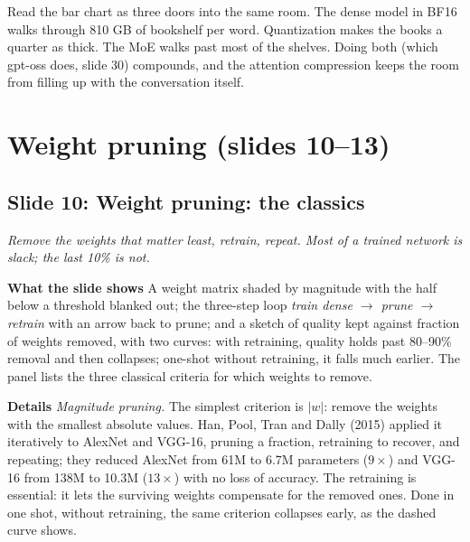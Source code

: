 \documentclass[11pt,letterpaper]{article}
\newcommand{\setstage}[1]{\colorlet{stagec}{#1}}
\newcommand{\slide}[3]{%
  \subsection[Slide #1: #2]{Slide #1: #2}%
  {\color{muted}\itshape #3\par}\medskip}
\newcommand{\para}[1]{\medskip\noindent\textbf{#1}\quad}
\newenvironment{intuition}{\begin{tcolorbox}[intuitionbox]}{\end{tcolorbox}}
\begin{document}
\begin{intuition}
Read the bar chart as three doors into the same room. The dense model in BF16 walks through 810 GB of bookshelf per word. Quantization makes the books a quarter as thick. The MoE walks past most of the shelves. Doing both (which gpt-oss does, slide 30) compounds, and the attention compression keeps the room from filling up with the conversation itself.
\end{intuition}
\clearpage
\setstage{tok}
\section{Weight pruning (slides 10--13)}

\slide{10}{Weight pruning: the classics}{Remove the weights that matter least, retrain, repeat. Most of a trained network is slack; the last 10\% is not.}

\para{What the slide shows} A weight matrix shaded by magnitude with the half below a threshold blanked out; the three-step loop \emph{train dense $\to$ prune $\to$ retrain} with an arrow back to prune; and a sketch of quality kept against fraction of weights removed, with two curves: with retraining, quality holds past 80--90\% removal and then collapses; one-shot without retraining, it falls much earlier. The panel lists the three classical criteria for which weights to remove.

\para{Details} \emph{Magnitude pruning.} The simplest criterion is $|w|$: remove the weights with the smallest absolute values. Han, Pool, Tran and Dally (2015) applied it iteratively to AlexNet and VGG-16, pruning a fraction, retraining to recover, and repeating; they reduced AlexNet from 61M to 6.7M parameters ($9\times$) and VGG-16 from 138M to 10.3M ($13\times$) with no loss of accuracy. The retraining is essential: it lets the surviving weights compensate for the removed ones. Done in one shot, without retraining, the same criterion collapses early, as the dashed curve shows.
\end{document}
